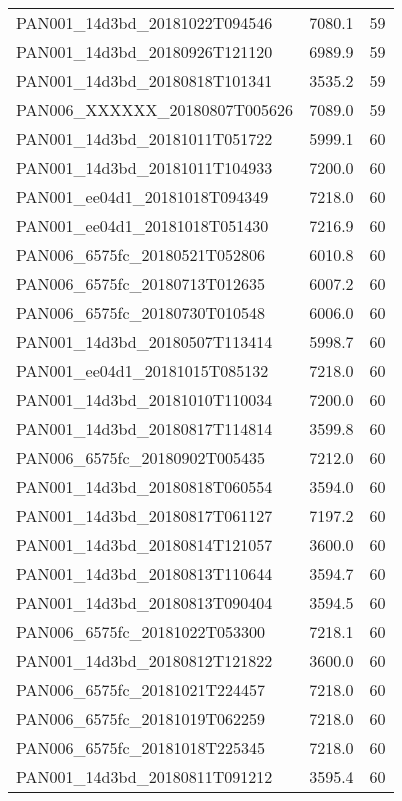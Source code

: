 \begin{tabular}{lrr}
PAN001\_14d3bd\_20181022T094546 &     7080.1 &       59 \\
PAN001\_14d3bd\_20180926T121120 &     6989.9 &       59 \\
PAN001\_14d3bd\_20180818T101341 &     3535.2 &       59 \\
PAN006\_XXXXXX\_20180807T005626 &     7089.0 &       59 \\
PAN001\_14d3bd\_20181011T051722 &     5999.1 &       60 \\
PAN001\_14d3bd\_20181011T104933 &     7200.0 &       60 \\
PAN001\_ee04d1\_20181018T094349 &     7218.0 &       60 \\
PAN001\_ee04d1\_20181018T051430 &     7216.9 &       60 \\
PAN006\_6575fc\_20180521T052806 &     6010.8 &       60 \\
PAN006\_6575fc\_20180713T012635 &     6007.2 &       60 \\
PAN006\_6575fc\_20180730T010548 &     6006.0 &       60 \\
PAN001\_14d3bd\_20180507T113414 &     5998.7 &       60 \\
PAN001\_ee04d1\_20181015T085132 &     7218.0 &       60 \\
PAN001\_14d3bd\_20181010T110034 &     7200.0 &       60 \\
PAN001\_14d3bd\_20180817T114814 &     3599.8 &       60 \\
PAN006\_6575fc\_20180902T005435 &     7212.0 &       60 \\
PAN001\_14d3bd\_20180818T060554 &     3594.0 &       60 \\
PAN001\_14d3bd\_20180817T061127 &     7197.2 &       60 \\
PAN001\_14d3bd\_20180814T121057 &     3600.0 &       60 \\
PAN001\_14d3bd\_20180813T110644 &     3594.7 &       60 \\
PAN001\_14d3bd\_20180813T090404 &     3594.5 &       60 \\
PAN006\_6575fc\_20181022T053300 &     7218.1 &       60 \\
PAN001\_14d3bd\_20180812T121822 &     3600.0 &       60 \\
PAN006\_6575fc\_20181021T224457 &     7218.0 &       60 \\
PAN006\_6575fc\_20181019T062259 &     7218.0 &       60 \\
PAN006\_6575fc\_20181018T225345 &     7218.0 &       60 \\
PAN001\_14d3bd\_20180811T091212 &     3595.4 &       60 \\

\end{tabular}
